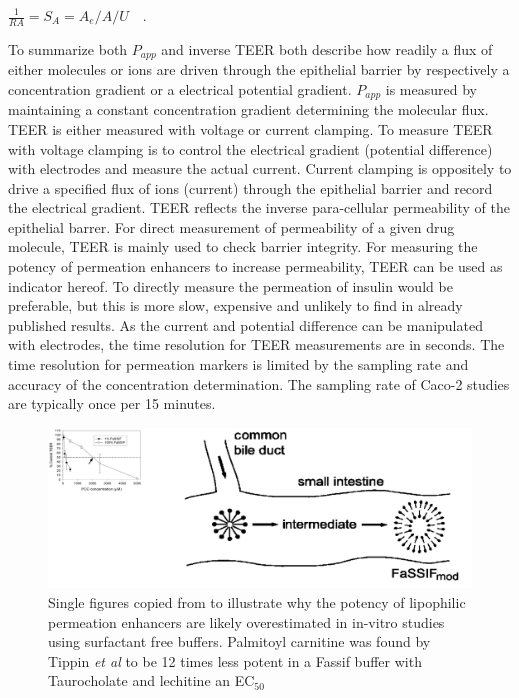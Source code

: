 $\frac{1}{RA} = S_A = A_e/A / U \quad.$

To summarize both $P_{app}$ and inverse TEER both describe how readily a flux of either molecules or ions are driven through the epithelial barrier by respectively a concentration gradient or a electrical potential gradient. $P_{app}$ is measured by maintaining a constant concentration gradient determining the molecular flux. TEER is either measured with voltage or current clamping. To measure TEER with voltage clamping is to control the electrical gradient (potential difference) with electrodes and measure the actual current. Current clamping is oppositely to drive a specified flux of ions (current) through the epithelial barrier and record the electrical gradient. TEER reflects the inverse para-cellular permeability of the epithelial barrer. For direct measurement of permeability of a given drug molecule, TEER is mainly used to check barrier integrity. For measuring the potency of permeation enhancers to increase permeability, TEER can be used as indicator hereof. To directly measure the permeation of insulin would be preferable, but this is more slow, expensive and unlikely to find in already published results. As the current and potential difference can be manipulated with electrodes, the time resolution for TEER measurements are in seconds. The time resolution for permeation markers is limited by the sampling rate and accuracy of the concentration determination. The sampling rate of Caco-2 studies are typically once per 15 minutes.

\begin{figure}[ht]
\label{devel_fassif}
\includegraphics[width=\textwidth,height=\textheight,keepaspectratio]{graphics/devel_Fasssif_PCC2.png}
\caption{Single figures copied from \cite{tippin2008biorelevant,nawroth2011liposome} to illustrate why the potency of lipophilic permeation enhancers are likely overestimated in in-vitro studies using surfactant free buffers. Palmitoyl carnitine was found by Tippin \textit{et al} to be 12 times less potent in a Fassif buffer with Taurocholate and lechitine an EC$_{50}$}
\end{figure}

